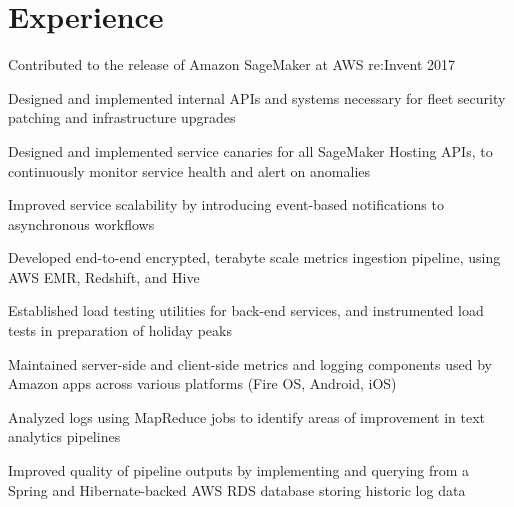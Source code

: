 \documentclass[]{deedy-resume-openfont}
\begin{document}
\begin{minipage}[t]{0.64\textwidth} 

\smallgap
\gap
\gap
\section{Experience}

\vspace{\topsep} %
\begin{tightemize}
\item Contributed to the release of Amazon SageMaker at AWS re:Invent 2017
\item Designed and implemented internal APIs and systems necessary for fleet security patching and infrastructure upgrades
\item Designed and implemented service canaries for all SageMaker Hosting APIs, to continuously monitor service health and alert on anomalies
\item Improved service scalability by introducing event-based notifications to asynchronous workflows
\end{tightemize}
\sectionsep

\begin{tightemize}
\item Developed end-to-end encrypted, terabyte scale metrics ingestion pipeline, using AWS EMR, Redshift, and Hive
\item Established load testing utilities for back-end services, and instrumented load tests in preparation of holiday peaks
\item Maintained server-side and client-side metrics and logging components used by Amazon apps across various platforms (Fire OS, Android, iOS)
\end{tightemize}
\sectionsep

\begin{tightemize}
\item Analyzed logs using MapReduce jobs to identify areas of improvement in text analytics pipelines
\item Improved quality of pipeline outputs by implementing and querying from a Spring and Hibernate-backed AWS RDS database storing historic log data
\end{tightemize}
\sectionsep


\end{minipage}
\end{document}
